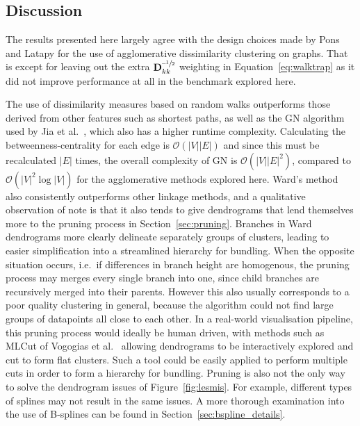 \subsection{Discussion}
\label{sec:heb_discussion}
The results presented here largely agree with the design choices made by Pons and Latapy \cite{Pons2006} for the use of agglomerative dissimilarity clustering on graphs. That is except for leaving out the extra $\mathbf{D}_{kk}^{\text{--}\sfrac{1}{2}}$ weighting in Equation~\ref{eq:walktrap} as it did not improve performance at all in the benchmark explored here.

The use of dissimilarity measures based on random walks outperforms those derived from other features such as shortest paths, as well as the GN algorithm used by Jia et al.\ \cite{Jia2011}, which also has a higher runtime complexity.
Calculating the betweenness-centrality for each edge is $\mathcal{O}(|V||E|)$ \cite{Brandes2001Centrality} and since this must be recalculated $|E|$ times, the overall complexity of GN is $\mathcal{O}(|V||E|^2)$, compared to $\mathcal{O}(|V|^2\log|V|)$ for the agglomerative methods explored here.
Ward's method also consistently outperforms other linkage methods, and a qualitative observation of note is that it also tends to give dendrograms that lend themselves more to the pruning process in Section~\ref{sec:pruning}. Branches in Ward dendrograms more clearly delineate separately groups of clusters, leading to easier simplification into a streamlined hierarchy for bundling.
When the opposite situation occurs, i.e.\ if differences in branch height are homogenous, the pruning process may merges every single branch into one, since child branches are recursively merged into their parents. However this also usually corresponds to a poor quality clustering in general, because the algorithm could not find large groups of datapoints all close to each other.
In a real-world visualisation pipeline, this pruning process would ideally be human driven, with methods such as MLCut of Vogogias et al.\ \cite{Vogogias2016} allowing dendrograms to be interactively explored and cut to form flat clusters. Such a tool could be easily applied to perform multiple cuts in order to form a hierarchy for bundling.
Pruning is also not the only way to solve the dendrogram issues of Figure~\ref{fig:lesmis}. For example, different types of splines may not result in the same issues. A more thorough examination into the use of B-splines can be found in Section~\ref{sec:bspline_details}.

